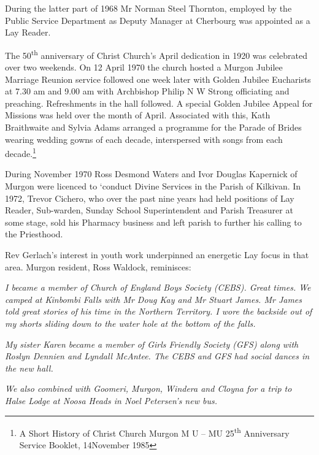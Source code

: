 During the latter part of 1968 Mr Norman Steel Thornton, employed by the Public Service Department as Deputy Manager at Cherbourg was appointed as a Lay Reader.



The 50\textsuperscript{th} anniversary of Christ Church's April dedication in 1920 was celebrated over two weekends. On 12 April 1970 the church hosted a Murgon Jubilee Marriage Reunion service followed one week later with Golden Jubilee Eucharists at 7.30 am and 9.00 am with Archbishop Philip N W Strong officiating and preaching. Refreshments in the hall followed. A special Golden Jubilee Appeal for Missions was held over the month of April. Associated with this, Kath Braithwaite and Sylvia Adams arranged a programme for the Parade of Brides wearing wedding gowns of each decade, interspersed with songs from each decade.\footnote{A Short History of Christ Church Murgon M U -- MU 25\textsuperscript{th} Anniversary Service Booklet, 14November 1985}


During November 1970 Ross Desmond Waters and Ivor Douglas Kapernick of Murgon were licenced to `conduct Divine Services in the Parish of Kilkivan. In 1972, Trevor Cichero, who over the past nine years had held positions of Lay Reader, Sub-warden, Sunday School Superintendent and Parish Treasurer at some stage, sold his Pharmacy business and left parish to further his calling to the Priesthood.



Rev Gerlach's interest in youth work underpinned an energetic Lay focus in that area. Murgon resident, Ross Waldock, reminisces:



\emph{I became a member of Church of England Boys Society (CEBS). Great times. We camped at Kinbombi Falls with Mr Doug Kay and Mr Stuart James. Mr James told great stories of his time in the Northern Territory. I wore the backside out of my shorts sliding down to the water hole at the bottom of the falls.}



\smallskip


\emph{My sister Karen became a member of Girls Friendly Society (GFS) along with Roslyn Dennien and Lyndall McAntee. The CEBS and GFS had social dances in the new hall.}



\emph{We also combined with Goomeri, Murgon, Windera and Cloyna for a trip to Halse Lodge at Noosa Heads in Noel Petersen's new bus.}



